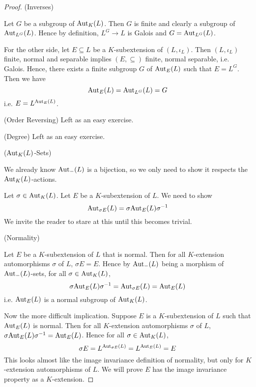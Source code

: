 \documentclass[../book.tex]{subfiles}
\begin{document}
\begin{proof}
    (Inverses)
        
        Let $G$ be a subgroup of $\text{Aut}_{K}(L)$. 
        Then $G$ is finite and clearly a subgroup of $\text{Aut}_{L^G}(L)$. 
        Hence by definition, $L^G \to L$ is Galois 
        and $G = \text{Aut}_{L^G}(L)$. 
        
        For the other side, let $E \subseteq L$ be a $K$-subextension of $(L,\iota_L)$.
        Then $(L,\iota_L)$ finite, normal and separable implies
        $(E,\subseteq)$ finite, normal separable, i.e. Galois.
        Hence, there exists a finite subgroup $G$ of $\text{Aut}_{E}(L)$ such that $E = L^G$.
        Then we have \[
            \text{Aut}_{E}(L) = \text{Aut}_{L^G}(L) = G
        \]
        i.e. $E = L^{\text{Aut}_{E}(L)}$. 
        
    (Order Reversing) Left as an easy exercise. 
        
    (Degree) Left as an easy exercise.
    
    ($\text{Aut}_{K}(L)$-Sets) 
        
        We already know $\text{Aut}_{-}(L)$ is a bijection,
        so we only need to show it respects the $\text{Aut}_{K}(L)$-actions.
        
        Let $\sigma \in \text{Aut}_{K}(L)$. Let $E$ be a $K$-subextension of $L$. 
        We need to show \[
            \text{Aut}_{\sigma E}(L) = \sigma \text{Aut}_{E}(L) \sigma^{-1}
        \]
        We invite the reader to stare at this
        until this becomes trivial. 
    
    (Normality)
        
        Let $E$ be a $K$-subextension of $L$ that is normal. 
        Then for all $K$-extension automorphisms $\sigma$ of $L$, $\sigma E = E$. 
        Hence by $\text{Aut}_{-}(L)$ being a morphism of $\text{Aut}_{-}(L)$-sets,
        for all $\sigma \in \text{Aut}_{K}(L)$, \[
            \sigma \text{Aut}_{E}(L) \sigma^{-1} = \text{Aut}_{\sigma E}(L) = \text{Aut}_{E}(L)
        \]
        i.e. $\text{Aut}_{E}(L)$ is a normal subgroup of $\text{Aut}_{K}(L)$.
        
        Now the more difficult implication. 
        Suppose $E$ is a $K$-subextension of $L$ such that
        $\text{Aut}_{E}(L)$ is normal. 
        Then for all $K$-extension automorphisms $\sigma$ of $L$, 
        $\sigma \text{Aut}_{E}(L) \sigma^{-1} = \text{Aut}_{E}(L)$.
        Hence for all $\sigma \in \text{Aut}_{K}(L)$, \[
            \sigma E = L^{\text{Aut}_{\sigma E}(L)} = L^{\text{Aut}_{E}(L)} = E
        \]
        This looks almost like the image invariance definition of normality,
        but only for $K$-extension automorphisms of $L$. 
        We will prove $E$ has the image invariance property as a $K$-extension. 
        

\end{proof}
\end{document}

